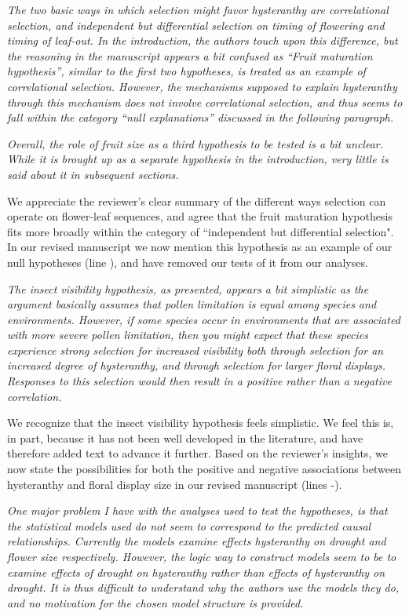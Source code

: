 \documentclass{article}[12pt]
\begin{document}
\emph{The two basic ways in which selection might favor hysteranthy are correlational selection, and independent but differential selection on timing of flowering and timing of leaf-out. In the introduction, the authors touch upon this difference, but the reasoning in the manuscript appears a bit confused as “Fruit maturation hypothesis”, similar to the first two hypotheses, is treated as an example of correlational selection. However, the mechanisms supposed to explain hysteranthy through this mechanism does not involve correlational selection, and thus seems to fall within the category “null explanations” discussed in the following paragraph.}

\emph{Overall, the role of fruit size as a third hypothesis to be tested is a bit unclear. While it is brought up as a separate hypothesis in the introduction, very little is said about it in subsequent sections.}

We appreciate the reviewer's clear summary of the different ways selection can operate on flower-leaf sequences, and agree that the fruit maturation hypothesis fits more broadly within the category of ``independent but differential selection". In our revised manuscript we now mention this hypothesis as an example of our null hypotheses (line ), and have removed our tests of it from our analyses. 

\emph{The insect visibility hypothesis, as presented, appears a bit simplistic as the argument basically assumes that pollen limitation is equal among species and environments. However, if some species occur in environments that are associated with more severe pollen limitation, then you might expect that these species experience strong selection for increased visibility both through selection for an increased degree of hysteranthy, and through selection for larger floral displays. Responses to this selection would then result in a positive rather than a negative correlation.}

We recognize that the insect visibility hypothesis feels simplistic. We feel this is, in part, because it has not been well developed in the literature, and have therefore added text to advance it further. Based on the reviewer's insights, we now state the possibilities for both the positive and negative associations between hysteranthy and floral display size in our revised manuscript (lines -). 

\emph{One major problem I have with the analyses used to test the hypotheses, is that the statistical models used do not seem to correspond to the predicted causal relationships. Currently the models examine effects hysteranthy on drought and flower size respectively. However, the logic way to construct models seem to be to examine effects of drought on hysteranthy rather than effects of hysteranthy on drought. It is thus difficult to understand why the authors use the models they do, and no motivation for the chosen model structure is provided.}
\end{document}
